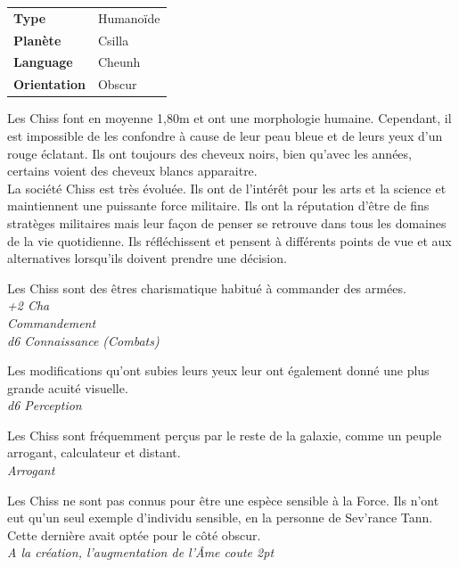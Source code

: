 \vspace{-80}

\begin{flushright}
\begin{tabular}{ l l }
	\textbf{Type} 			& Humanoïde \\
   	\textbf{Planète} 		& Csilla \\
   	\textbf{Language} 		& Cheunh \\
   	\textbf{Orientation} 	& Obscur \\
\end{tabular}
\end{flushright}

\vspace{15}

Les Chiss font en moyenne 1,80m et ont une morphologie humaine. Cependant, il est impossible de les confondre à cause de leur peau bleue et de leurs yeux d’un rouge éclatant. Ils ont toujours des cheveux noirs, bien qu’avec les années, certains voient des cheveux blancs apparaitre. \\ 

La société Chiss est très évoluée. Ils ont de l’intérêt pour les arts et la science et maintiennent une puissante force militaire. Ils ont la réputation d’être de fins stratèges militaires mais leur façon de penser se retrouve dans tous les domaines de la vie quotidienne. Ils réfléchissent et pensent à différents points de vue et aux alternatives lorsqu’ils doivent prendre une décision.  

\begin{description}[align=left]
\item [Charismatique] 			%
		Les Chiss sont des êtres charismatique habitué à commander des armées.\\
		\emph{+2 Cha}\\
		\emph{Commandement}\\
		\emph{d6 Connaissance (Combats)}
\item [Aquité visuelle] 		%
		Les modifications qu’ont subies leurs yeux leur ont également donné une plus grande acuité visuelle.\\
		\emph{d6 Perception}
\item [Arrogant] 				%
		Les Chiss sont fréquemment perçus par le reste de la galaxie, comme un peuple arrogant, calculateur et distant.\\
		\emph{Arrogant}
\item [Insensible à la Force] 		%
		Les Chiss ne sont pas connus pour être une espèce sensible à la Force. Ils n’ont eut qu’un seul exemple d’individu sensible, en la personne de Sev’rance Tann. Cette dernière avait optée pour le côté obscur.\\
		\emph{A la création, l'augmentation de l'\^Ame coute 2pt}
\end{description}

